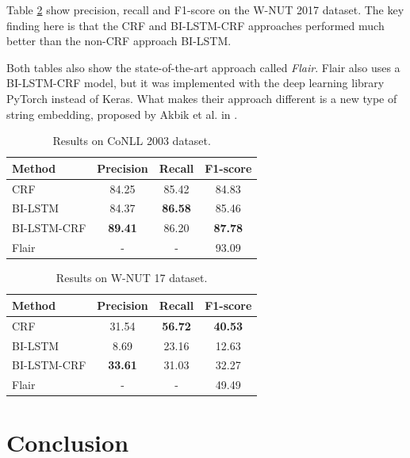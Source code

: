 \documentclass[12pt]{book}
\begin{document}
	Table \ref{tab:res_wnut} show precision, recall and F1-score on the W-NUT 2017 dataset. The key finding here is that the CRF and BI-LSTM-CRF approaches performed much better than the non-CRF approach BI-LSTM.
	
	Both tables also show the state-of-the-art approach called \textit{Flair}. Flair also uses a BI-LSTM-CRF model, but it was implemented with the deep learning library PyTorch \cite{pytorch} instead of Keras. What makes their approach different is a new type of string embedding, proposed by Akbik et al. in \cite{akbik2018contextual}.
	
	\begin{table}
		\begin{center}
			\begin{tabular}{| l | c | c | c |}
				\hline
				Method & Precision & Recall & F1-score \\ \hline
				CRF & 84.25 & 85.42 & 84.83 \\ \hline
				BI-LSTM & 84.37 & \textbf{86.58} & 85.46 \\ \hline
				BI-LSTM-CRF & \textbf{89.41} & 86.20 & \textbf{87.78} \\ \hline
				Flair & - & - & 93.09 \\ \hline
			\end{tabular}
		\end{center}
		\caption{Results on CoNLL 2003 dataset.}
		\label{tab:res_conll}
	\end{table}
	\begin{table}
		\begin{center}
			\begin{tabular}{| l | c | c | c |}
				\hline
				Method & Precision & Recall & F1-score \\ \hline
				CRF & 31.54 & \textbf{56.72} & \textbf{40.53} \\ \hline
				BI-LSTM & 8.69 & 23.16 & 12.63 \\ \hline
				BI-LSTM-CRF & \textbf{33.61} & 31.03 & 32.27 \\ \hline
				Flair & - & - & 49.49 \\ \hline
			\end{tabular}
		\end{center}
		\caption{Results on W-NUT 17 dataset.}
		\label{tab:res_wnut}
	\end{table}

	\chapter{Conclusion}
	\label{chap:conclusion}
	
\end{document}
